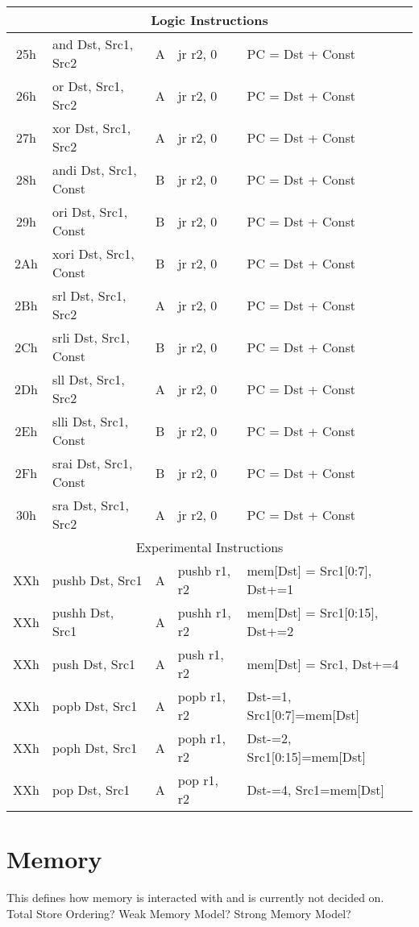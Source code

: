 \documentclass[]{article}
\begin{document}
\begin{longtable}{|c|l|c|l|l|}
	\multicolumn{5}{|c|}{Logic Instructions} \\
	\hline
	25h & and Dst, Src1, Src2 & A & jr r2, 0 & PC = Dst + Const \\
	\hline
	26h & or Dst, Src1, Src2 & A & jr r2, 0 & PC = Dst + Const \\
	\hline
	27h & xor Dst, Src1, Src2 & A & jr r2, 0 & PC = Dst + Const \\
	\hline
	28h & andi Dst, Src1, Const & B & jr r2, 0 & PC = Dst + Const \\
	\hline
	29h & ori Dst, Src1, Const & B & jr r2, 0 & PC = Dst + Const \\
	\hline
	2Ah & xori Dst, Src1, Const & B & jr r2, 0 & PC = Dst + Const \\
	\hline
	2Bh & srl Dst, Src1, Src2 & A & jr r2, 0 & PC = Dst + Const \\
	\hline
	2Ch & srli Dst, Src1, Const & B & jr r2, 0 & PC = Dst + Const \\
	\hline
	2Dh & sll Dst, Src1, Src2 & A & jr r2, 0 & PC = Dst + Const \\
	\hline
	2Eh & slli Dst, Src1, Const & B & jr r2, 0 & PC = Dst + Const \\
	\hline
	2Fh & srai Dst, Src1, Const & B & jr r2, 0 & PC = Dst + Const \\
	\hline
	30h & sra Dst, Src1, Src2 & A & jr r2, 0 & PC = Dst + Const \\
	\hline
	\multicolumn{5}{|c|}{Experimental Instructions} \\
	\hline
	XXh & pushb Dst, Src1 & A & pushb r1, r2 & mem[Dst] = Src1[0:7], Dst+=1 \\
	\hline
	XXh & pushh Dst, Src1 & A & pushh r1, r2 & mem[Dst] = Src1[0:15], Dst+=2 \\
	\hline
	XXh & push Dst, Src1 & A & push r1, r2 & mem[Dst] = Src1, Dst+=4 \\
	\hline
	XXh & popb Dst, Src1 & A & popb r1, r2 & Dst-=1, Src1[0:7]=mem[Dst] \\
	\hline
	XXh & poph Dst, Src1 & A & poph r1, r2 & Dst-=2, Src1[0:15]=mem[Dst] \\
	\hline
	XXh & pop Dst, Src1 & A & pop r1, r2 & Dst-=4, Src1=mem[Dst] \\
	\hline
\end{longtable}

\section{Memory}
This defines how memory is interacted with and is currently not decided on.
Total Store Ordering? Weak Memory Model? Strong Memory Model?
\end{document}

